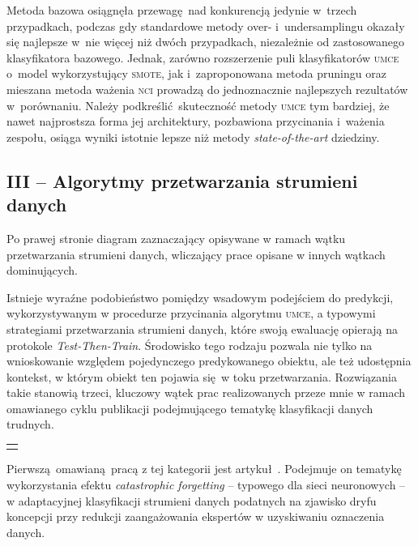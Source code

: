 Metoda bazowa osiągnęła przewagę nad konkurencją jedynie w~trzech przypadkach, podczas gdy standardowe metody over- i~undersamplingu okazały się najlepsze w~nie więcej niż dwóch przypadkach, niezależnie od zastosowanego klasyfikatora bazowego. Jednak, zarówno rozszerzenie puli klasyfikatorów \textsc{umce} o~model wykorzystujący \textsc{smote}, jak i~zaproponowana metoda pruningu oraz mieszana metoda ważenia \textsc{nci} prowadzą do jednoznacznie najlepszych rezultatów w~porównaniu. Należy podkreślić skuteczność metody \textsc{umce} tym bardziej, że nawet najprostsza forma jej architektury, pozbawiona przycinania i~ważenia zespołu, osiąga wyniki istotnie lepsze niż metody \emph{state-of-the-art} dziedziny.

\subsection*{III -- Algorytmy przetwarzania strumieni danych}

\marginnote{\scalebox{.6}{}}

Po prawej stronie diagram zaznaczający opisywane w ramach wątku przetwarzania strumieni danych, wliczający prace opisane w innych wątkach dominujących.

Istnieje wyraźne podobieństwo pomiędzy wsadowym podejściem do predykcji, wykorzystywanym w procedurze przycinania algorytmu \textsc{umce}, a typowymi strategiami przetwarzania strumieni danych, które swoją ewaluację opierają na protokole \emph{Test-Then-Train}. Środowisko tego rodzaju pozwala nie tylko na wnioskowanie względem pojedynczego predykowanego obiektu, ale też udostępnia kontekst, w którym obiekt ten pojawia się w toku przetwarzania. Rozwiązania takie stanowią trzeci, kluczowy wątek prac realizowanych przeze mnie w ramach omawianego cyklu publikacji podejmującego tematykę klasyfikacji danych trudnych.\vspace{1em}

{
\color{red}
\noindent\begin{tabular}{p{\textwidth}}
	\toprule &
\end{tabular}\vspace{-1em}
}
\noindent Pierwszą omawianą pracą z tej kategorii jest artykuł~. Podejmuje on tematykę wykorzystania efektu \emph{catastrophic forgetting} -- typowego dla sieci neuronowych -- w adaptacyjnej klasyfikacji strumieni danych podatnych na zjawisko dryfu koncepcji przy redukcji zaangażowania ekspertów w uzyskiwaniu oznaczenia danych. 

